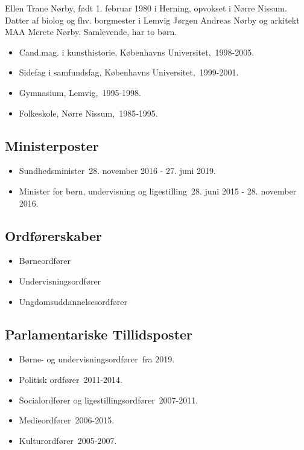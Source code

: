 \documentclass[11pt, a4paper]{awesome-cv}
\begin{document}
\makecvheader[R]
\makelettertitle
\begin{cvletter}
Ellen Trane Nørby, født 1. februar 1980 i Herning, opvokset i Nørre Nissum. Datter af biolog og fhv. borgmester i Lemvig Jørgen Andreas Nørby og arkitekt MAA Merete Nørby. Samlevende, har to børn.

\begin{itemize}
\item Cand.mag. i kunsthistorie, Københavns Universitet, 1998-2005.
\item Sidefag i samfundsfag, Københavns Universitet, 1999-2001.
\item Gymnasium, Lemvig, 1995-1998.
\item Folkeskole, Nørre Nissum, 1985-1995.
\end{itemize}
\subsection*{Ministerposter}
\begin{itemize}
\item Sundhedsminister 28. november 2016 - 27. juni 2019.
\item Minister for børn, undervisning og ligestilling 28. juni 2015 - 28. november 2016.
\end{itemize}
\subsection*{Ordførerskaber}
\begin{itemize}
\item Børneordfører
\item Undervisningsordfører
\item Ungdomsuddannelsesordfører
\end{itemize}
\subsection*{Parlamentariske Tillidsposter}
\begin{itemize}
\item Børne- og undervisningsordfører fra 2019.
\item Politisk ordfører 2011-2014.
\item Socialordfører og ligestillingsordfører 2007-2011.
\item Medieordfører 2006-2015.
\item Kulturordfører 2005-2007.
\end{itemize}

\end{cvletter}
\end{document}
